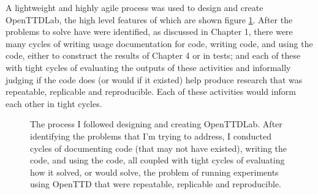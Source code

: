 \documentclass[logo,msc,dsti]{infthesis}    %
\begin{document}
A lightweight and highly agile process was used to design and create OpenTTDLab, the high level features of which are shown figure \ref{fig:solo-agile}. After the problems to solve have were identified, as discussed in Chapter 1, there were many cycles of writing usage documentation for code, writing code, and using the code, either to construct the results of Chapter 4 or in tests; and each of these with tight cycles of evaluating the outputs of these activities and informally judging if the code does (or would if it existed) help produce research that was repeatable, replicable and reproducible. Each of these activities would inform each other in tight cycles.

\begin{figure}[h]
\centering
{}
\caption{The process I followed designing and creating OpenTTDLab. After identifying the problems that I'm trying to address, I conducted cycles of documenting code (that may not have existed), writing the code, and using the code, all coupled with tight cycles of evaluating how it solved, or would solve, the problem of running experiments using OpenTTD that were repeatable, replicable and reproducible.}
\label{fig:solo-agile}
\end{figure}
\end{document}

